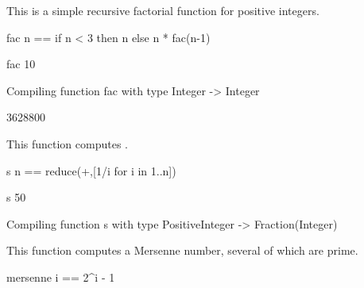 \begin{xtc}
\begin{xtccomment}
This is a simple recursive factorial function for positive integers.
\end{xtccomment}
\begin{spadsrc}
fac n == if n < 3 then n else n * fac(n-1) 
\end{spadsrc}
\end{xtc}
\begin{xtc}
\begin{xtccomment}
\end{xtccomment}
\begin{spadsrc}
fac 10 
\end{spadsrc}
\begin{MessageOutput}
   Compiling function fac with type Integer -> Integer 
\end{MessageOutput}
\begin{TeXOutput}
\begin{fricasmath}{2}
3628800%
\end{fricasmath}
\end{TeXOutput}
\end{xtc}
\begin{xtc}
\begin{xtccomment}
This function computes .
\end{xtccomment}
\begin{spadsrc}
s n == reduce(+,[1/i for i in 1..n]) 
\end{spadsrc}
\end{xtc}
\begin{xtc}
\begin{xtccomment}
\end{xtccomment}
\begin{spadsrc}
s 50 
\end{spadsrc}
\begin{MessageOutput}
   Compiling function s with type PositiveInteger -> Fraction(Integer) 
\end{MessageOutput}
\begin{TeXOutput}
\begin{fricasmath}{4}
%
\end{fricasmath}
\end{TeXOutput}
\end{xtc}
\begin{xtc}
\begin{xtccomment}
This function computes a Mersenne number, several of which are prime.
\end{xtccomment}
\begin{spadsrc}
mersenne i == 2^i - 1 
\end{spadsrc}
\end{xtc}
